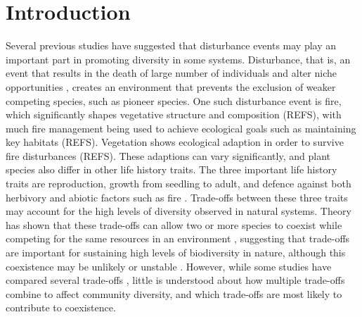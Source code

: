 \documentclass[a4paper]{article}
\begin{document}
\section{Introduction}\label{intro}
Several previous studies \citep[e.g.][]{denslow1987tropical,sousa1984role} have suggested that disturbance events may play an important part in promoting diversity in some systems. Disturbance, that is, an event that results in the death of large number of individuals and alter niche opportunities \citep{shea2004moving}, creates an environment that prevents the exclusion of weaker competing species, such as pioneer species. One such disturbance event is fire, which significantly shapes vegetative structure and composition (REFS), with much fire management being used to achieve ecological goals such as maintaining key habitats (REFS). Vegetation shows ecological adaption in order to survive fire disturbances (REFS). These adaptions can vary significantly, and plant species also differ in other life history traits. The three important life history traits are reproduction, growth from seedling to adult, and defence against both herbivory and abiotic factors such as fire \citep{bazzaz1987allocating}. Trade-offs between these three traits may account for the high levels of diversity observed in natural systems. Theory has shown that these trade-offs can allow two or more species to coexist while competing for  the same resources in an environment \citep[e.g.][]{kisdi2003coexistence,levins1971regional,bonsall2004life}, suggesting that trade-offs are important for sustaining high levels of biodiversity in nature, although this coexistence may be unlikely or unstable \citep{nattrass2012quantifying,gyllenberg2005impossibility}. However, while some studies have compared several trade-offs \citep[e.g.][]{tilman1990constraints,grime1977evidence}, little is understood about how multiple trade-offs combine to affect community diversity, and which trade-offs are most likely to contribute to coexistence.
\end{document}
